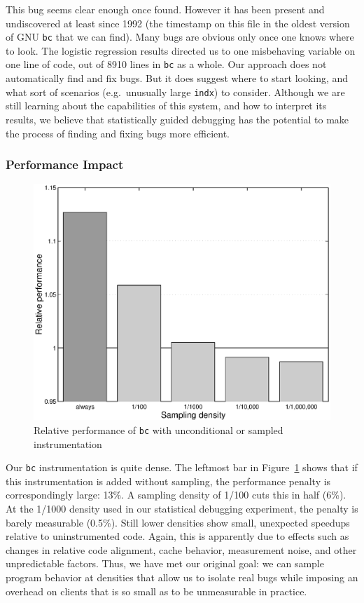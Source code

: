 This bug seems clear enough once found.  However it has been present
and undiscovered at least since 1992 (the time\-stamp on this file in
the oldest version of GNU \texttt{bc} that we can find).  Many bugs
are obvious only once one knows where to look.  The logistic
regression results directed us to one misbehaving variable on one line
of code, out of 8910 lines in \texttt{bc} as a whole.  Our approach
does not automatically find and fix bugs.  But it does suggest where
to start looking, and what sort of scenarios (e.g.\ unusually large
\texttt{indx}) to consider.  Although we are still learning about the
capabilities of this system, and how to interpret its results, we
believe that statistically guided debugging has the potential to make
the process of finding and fixing bugs more efficient.

\subsubsection{Performance Impact}

\begin{figure}
  \centering
  \small
  \includegraphics[width=\columnwidth]{applications/bc_density}
  \caption{Relative performance of \texttt{bc} with unconditional or
    sampled instrumentation}
  \label{fig:bc:slowdown}
\end{figure}

Our \texttt{bc} instrumentation is quite dense.  The leftmost bar in
Figure~\ref{fig:bc:slowdown} shows that if this instrumentation is
added without sampling, the performance penalty is correspondingly
large: 13\%.  A sampling density of 1/100 cuts this in half (6\%).  At
the 1/1000 density used in our statistical debugging experiment, the
penalty is barely measurable (0.5\%).  Still lower densities show
small, unexpected speedups relative to uninstrumented code.  Again,
this is apparently due to effects such as changes in relative code
alignment, cache behavior, measurement noise, and other unpredictable
factors.  Thus, we have met our original goal: we can sample program
behavior at densities that allow us to isolate real bugs while
imposing an overhead on clients that is so small as to be unmeasurable
in practice.


